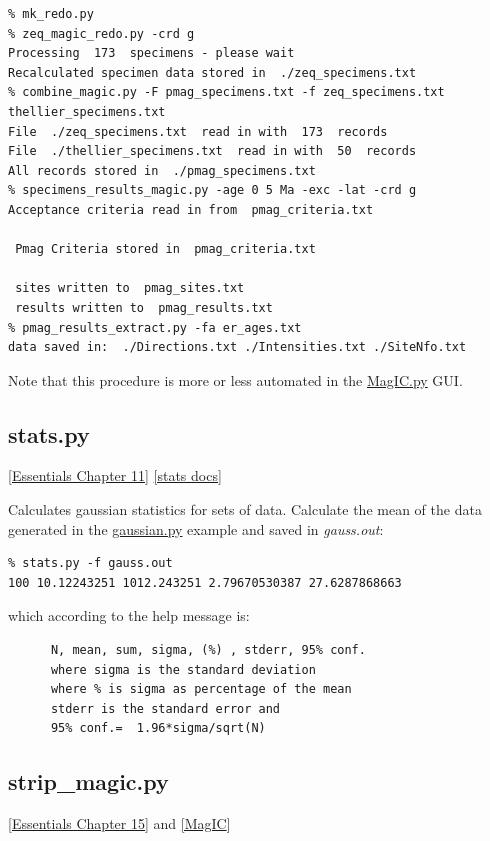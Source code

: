 \documentclass[11pt]{book}
\begin{document}
{{\begin{verbatim}
% mk_redo.py
% zeq_magic_redo.py -crd g
Processing  173  specimens - please wait
Recalculated specimen data stored in  ./zeq_specimens.txt
% combine_magic.py -F pmag_specimens.txt -f zeq_specimens.txt thellier_specimens.txt
File  ./zeq_specimens.txt  read in with  173  records
File  ./thellier_specimens.txt  read in with  50  records
All records stored in  ./pmag_specimens.txt
% specimens_results_magic.py -age 0 5 Ma -exc -lat -crd g
Acceptance criteria read in from  pmag_criteria.txt

 Pmag Criteria stored in  pmag_criteria.txt 

 sites written to  pmag_sites.txt
 results written to  pmag_results.txt
% pmag_results_extract.py -fa er_ages.txt
data saved in:  ./Directions.txt ./Intensities.txt ./SiteNfo.txt
\end{verbatim}

Note that this procedure is more or less automated in the \href{#MagIC.py}{MagIC.py} GUI.  


\subsection{stats.py}
\href{http://magician.ucsd.edu/Essentials_2/WebBook2ch11.html#ch11}{[Essentials Chapter 11]}
\href{http://earthref.org/PmagPy/pmagpydocs/stats-module.html}{[stats docs]}

Calculates gaussian statistics for sets of data.  
Calculate the mean of the data generated in the \href{#gaussian.py}{gaussian.py} example and saved in {\it gauss.out}:    

\begin{verbatim}
% stats.py -f gauss.out
100 10.12243251 1012.243251 2.79670530387 27.6287868663
\end{verbatim}

which according to the help message is: 

\begin{verbatim}
      N, mean, sum, sigma, (%) , stderr, 95% conf.
      where sigma is the standard deviation
      where % is sigma as percentage of the mean
      stderr is the standard error and 
      95% conf.=  1.96*sigma/sqrt(N)
\end{verbatim}

\subsection{strip\_magic.py}
\href{http://magician.ucsd.edu/Essentials_2/WebBook2ch15.html#ch15}{[Essentials Chapter 15]} and \href{#MagIC}{[MagIC}]

}}
\end{document}
